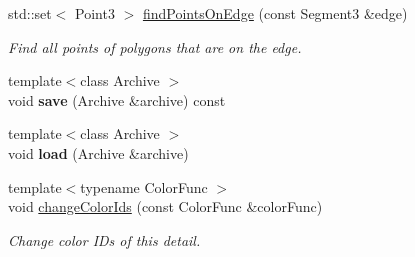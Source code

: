 \begin{DoxyCompactItemize}
std\+::set$<$ Point3 $>$ \mbox{\hyperlink{classpepr3d_1_1_triangle_detail_a3d8d23f8835e264356b503cc495c71e4}{find\+Points\+On\+Edge}} (const Segment3 \&edge)
\begin{DoxyCompactList}\small\item\em Find all points of polygons that are on the edge. \end{DoxyCompactList}\item 
\mbox{\label{classpepr3d_1_1_triangle_detail_af671c482070226f504855f702e1cf9ac}} 
{\footnotesize template$<$class Archive $>$ }\\void {\bfseries save} (Archive \&archive) const
\item 
\mbox{\label{classpepr3d_1_1_triangle_detail_acad2f44169bb8872522e60d11f54fe86}} 
{\footnotesize template$<$class Archive $>$ }\\void {\bfseries load} (Archive \&archive)
\item 
{\footnotesize template$<$typename Color\+Func $>$ }\\void \mbox{\hyperlink{classpepr3d_1_1_triangle_detail_a9bce9da8bea065df486537a2933f635c}{change\+Color\+Ids}} (const Color\+Func \&color\+Func)
\begin{DoxyCompactList}\small\item\em Change color I\+Ds of this detail. \end{DoxyCompactList}\end{DoxyCompactItemize}
